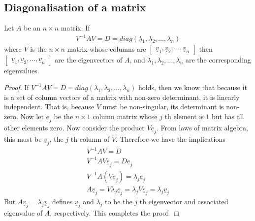 \documentclass[a4paper]{article}
\theoremstyle{plain}
\newtheorem{thm}{Theorem}[section]
\theoremstyle{definition}
\theoremstyle{remark}
\begin{document}
\subsection{Diagonalisation of a matrix}
\begin{tcolorbox}[colback=black!3!white,colframe=black!60!white,title=\begin{thm}Diagonalisation \label{Diagonalisation}\end{thm}]
	Let $A$ be an $n\times n$ matrix. If
		\begin{align}
		V^{-1}AV = D = diag(\lambda_1,\lambda_2,\ldots,\lambda_n)
		\end{align}
		where $V$ is the $n \times n$ matrix whose columns are $\begin{bmatrix} \underline{v}_1, \underline{v}_2,\ldots,\underline{v}_n \end{bmatrix} $  then $\begin{bmatrix} \underline{v}_1, \underline{v}_2,\ldots,\underline{v}_n \end{bmatrix} $ are  the eigenvectors of  $A$, and $\lambda_1, \lambda_2, \ldots, \lambda_n$ are the corresponding eigenvalues.
		\begin{proof}
			If $V^{-1}AV = D = diag(\lambda_1,\lambda_2,\ldots,\lambda_n)$ holds, then we know that because it is a set of column vectors of a matrix with non-zero determinant, it is linearly independent. That is, because $V$ must be non-singular, its determinant is non-zero. Now let $\underline{e}_j$ be the $n \times 1$ column matrix whose $j$ th element is $1$ but has all other elements zero. Now consider the product $V\underline{e}_j$. From laws of matrix algebra, this must be $\underline{v}_j$, the $j$ th column of $V$. Therefore we have the implications
			\begin{align*}
				V^{-1}AV = D \\
				V^{-1}AV\underline{e}_j = D\underline{e}_j \\
				V^{-1}A(V\underline{e}_j) = \lambda_j \underline{e}_j \\
				A\underline{v}_j = V \lambda_j \underline{e}_j = \lambda_j V \underline{e}_j = \lambda_j \underline{v}_j
			\end{align*}
		But $A\underline{v}_j = \lambda_j \underline{v}_j$ defines $\underline{v}_j$ and $\lambda_j$ to be the $j$ th eigenvector and associated eigenvalue of $A$, respectively. This completes the proof.
		\end{proof}
\end{tcolorbox}
\end{document}
